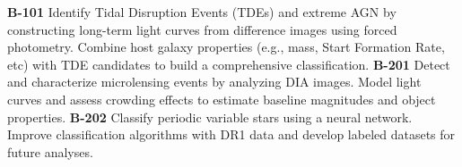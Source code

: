 \textbf{B-101} Identify Tidal Disruption Events (TDEs) and extreme AGN by constructing long-term light curves from difference images using forced photometry.  Combine host galaxy properties (e.g., mass, Start Formation Rate, etc) with TDE candidates to build a comprehensive classification.
\textbf{B-201}  Detect and characterize microlensing events by analyzing DIA images. Model light curves and assess crowding effects to estimate baseline magnitudes and object properties. 
\textbf{B-202} Classify periodic variable stars using a neural network. Improve classification algorithms with DR1 data and develop labeled datasets for future analyses.
